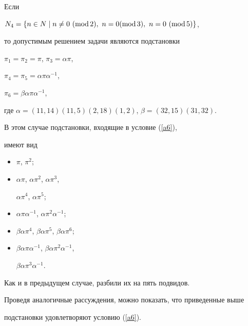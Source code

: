 \begin{pf}


Если


$N_4=\{n\in N\mid n\neq 0\ (\Mod 2),\ n=0(\Mod 3),\ n=0\ (\Mod 5)\}$,


то допустимым решением задачи являются подстановки


$\pi_1 = \pi_2 = \pi$, $\pi_3 = \alpha \pi$,


$\pi_4 = \pi_5 = \alpha \pi \alpha^{-1}$,


$\pi_6 = \beta \alpha \pi \alpha^{-1}$,


где $\alpha=(11,14)(11,5)(2,18)(1,2)$, $\beta=(32,15)(31,32)$.





В этом случае подстановки, входящие в условие (\ref{a6}),


имеют вид


\begin{itemize}


\item[I.] $\pi$, $\pi^2$;


\item[II.] $\alpha \pi$, $\alpha \pi^2$, $\alpha \pi^3$,


$\alpha \pi^4$, $\alpha \pi^5$;


\item[III.] $\alpha \pi \alpha^{-1}$, $\alpha \pi^2 \alpha^{-1}$;


\item[IV.] $\beta \alpha \pi^4$, $\beta \alpha \pi^5$, $\beta \alpha \pi^6$;


\item[V.] $\beta\alpha\pi\alpha^{-1}$, $\beta\alpha\pi^2 \alpha^{-1}$,


$\beta \alpha \pi^3 \alpha^{-1}$.


\end{itemize}





Как и в предыдущем случае, разбили их на пять подвидов.





Проведя аналогичные рассуждения, можно показать, что приведенные выше


подстановки удовлетворяют условию (\ref{a6}).


\end{pf}





